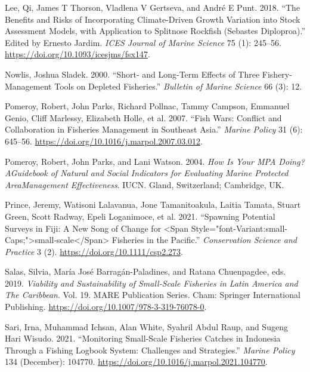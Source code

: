\documentclass[
]{article}
\newlength{\cslhangindent}
\newlength{\cslentryspacingunit} %
\newenvironment{CSLReferences}[2] %
 {%
  \setlength{\parindent}{0pt}
  \ifodd #1
  \let\oldpar\par
  \def\par{\hangindent=\cslhangindent\oldpar}
  \fi
  \setlength{\parskip}{#2\cslentryspacingunit}
 }%
 {}
\begin{document}
\begin{CSLReferences}{1}{0}
\leavevmode{}%
Lee, Qi, James T Thorson, Vladlena V Gertseva, and André E Punt. 2018. {``The Benefits and Risks of Incorporating Climate-Driven Growth Variation into Stock Assessment Models, with Application to {Splitnose} {Rockfish} ({Sebastes} Diploproa).''} Edited by Ernesto Jardim. \emph{ICES Journal of Marine Science} 75 (1): 245--56. \url{https://doi.org/10.1093/icesjms/fsx147}.

\leavevmode{}%
Nowlis, Joshua Sladek. 2000. {``Short- and Long-Term Effects of Three Fishery-Management Tools on Depleted Fisheries.''} \emph{Bulletin of Marine Science} 66 (3): 12.

\leavevmode{}%
Pomeroy, Robert, John Parks, Richard Pollnac, Tammy Campson, Emmanuel Genio, Cliff Marlessy, Elizabeth Holle, et al. 2007. {``Fish Wars: {Conflict} and Collaboration in Fisheries Management in {Southeast} {Asia}.''} \emph{Marine Policy} 31 (6): 645--56. \url{https://doi.org/10.1016/j.marpol.2007.03.012}.

\leavevmode{}%
Pomeroy, Robert, John Parks, and Lani Watson. 2004. \emph{How Is Your {MPA} Doing? {AGuidebook} of {Natural} and {Social} {Indicators} for {Evaluating} {Marine} {Protected} {AreaManagement} {Effectiveness}}. {IUCN}. Gland, Switzerland; Cambridge, UK.

\leavevmode{}%
Prince, Jeremy, Watisoni Lalavanua, Jone Tamanitoakula, Laitia Tamata, Stuart Green, Scott Radway, Epeli Loganimoce, et al. 2021. {``Spawning Potential Surveys in {Fiji}: {A} New Song of Change for {\textless{}}Span Style="font-Variant:small-Caps;"{\textgreater{}}small‐scale{\textless{}}/Span{\textgreater{}} Fisheries in the {Pacific}.''} \emph{Conservation Science and Practice} 3 (2). \url{https://doi.org/10.1111/csp2.273}.

\leavevmode{}%
Salas, Silvia, María José Barragán-Paladines, and Ratana Chuenpagdee, eds. 2019. \emph{Viability and {Sustainability} of {Small}-{Scale} {Fisheries} in {Latin} {America} and {The} {Caribbean}}. Vol. 19. {MARE} {Publication} {Series}. Cham: Springer International Publishing. \url{https://doi.org/10.1007/978-3-319-76078-0}.

\leavevmode{}%
Sari, Irna, Muhammad Ichsan, Alan White, Syahril Abdul Raup, and Sugeng Hari Wisudo. 2021. {``Monitoring Small-Scale Fisheries Catches in {Indonesia} Through a Fishing Logbook System: {Challenges} and Strategies.''} \emph{Marine Policy} 134 (December): 104770. \url{https://doi.org/10.1016/j.marpol.2021.104770}.


\end{CSLReferences}
\end{document}
